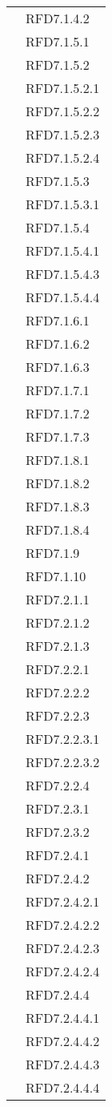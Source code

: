 \begin{longtable}{|>{\centering}m{10cm}|m{3cm}<{\centering}|}
& RFD7.1.4.2\\
& RFD7.1.5.1\\
& RFD7.1.5.2\\
& RFD7.1.5.2.1\\
& RFD7.1.5.2.2\\
& RFD7.1.5.2.3\\
& RFD7.1.5.2.4\\
& RFD7.1.5.3\\
& RFD7.1.5.3.1\\
& RFD7.1.5.4\\
& RFD7.1.5.4.1\\
& RFD7.1.5.4.3\\
& RFD7.1.5.4.4\\
& RFD7.1.6.1\\
& RFD7.1.6.2\\
& RFD7.1.6.3\\
& RFD7.1.7.1\\
& RFD7.1.7.2\\
& RFD7.1.7.3\\
& RFD7.1.8.1\\
& RFD7.1.8.2\\
& RFD7.1.8.3\\
& RFD7.1.8.4\\
& RFD7.1.9\\
& RFD7.1.10\\
& RFD7.2.1.1\\
& RFD7.2.1.2\\
& RFD7.2.1.3\\
& RFD7.2.2.1\\
& RFD7.2.2.2\\
& RFD7.2.2.3\\
& RFD7.2.2.3.1\\
& RFD7.2.2.3.2\\
& RFD7.2.2.4\\
& RFD7.2.3.1\\
& RFD7.2.3.2\\
& RFD7.2.4.1\\
& RFD7.2.4.2\\
& RFD7.2.4.2.1\\
& RFD7.2.4.2.2\\
& RFD7.2.4.2.3\\
& RFD7.2.4.2.4\\
& RFD7.2.4.4\\
& RFD7.2.4.4.1\\
& RFD7.2.4.4.2\\
& RFD7.2.4.4.3\\
& RFD7.2.4.4.4\\

\end{longtable}
